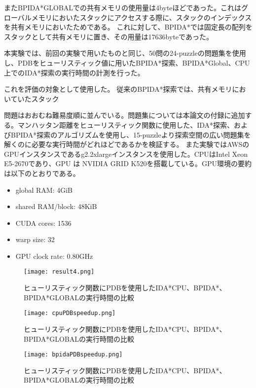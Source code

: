 \documentclass[a4paper,11pt,oneside,openany]{jsbook}
\begin{document}
またBPIDA*GLOBALでの共有メモリの使用量は4byteほどであった。これはグローバルメモリにおいたスタックにアクセスする際に、スタックのインデックスを共有メモリにおいたためである。
これに対して、BPIDA*では固定長の配列をスタックとして共有メモリに置き、その用量は17636byteであった。



本実験では、前回の実験で用いたものと同じ、50問の24-puzzleの問題集を使用し、PDBをヒューリスティック値に用いたBPIDA*探索、BPIDA*Global、CPU上でのIDA*探索の実行時間の計測を行った。

これを評価の対象として使用した。
従来のBPIDA*探索では、共有メモリにおいていたスタック

問題はおおむね難易度順に並んでいる。問題集については本論文の付録に追加する。マンハッタン距離をヒューリスティック関数に使用した、IDA*探索、およびBPIDA*探索\cite{HA17}のアルゴリズムを使用し、15-puzzleより探索空間の広い問題集を解くのに必要な実行時間がどれほどであるかを検証する。
また実験ではAWSのGPUインスタンスであるg2.2xlargeインスタンスを使用した。CPUはIntel Xeon E5-2670であり、GPU
は NVIDIA GRID K520を搭載している。GPU環境の要約は以下のとおりである。
\begin{itemize}
 \item global RAM: 4GiB
 \item shared RAM/block: 48KiB
 \item CUDA cores: 1536
 \item warp size: 32
 \item GPU clock rate: 0.80GHz
\end{itemize}


\begin{figure}[hbtp]
\begin{center}
\texttt{[image: result4.png]}
\caption{ヒューリスティック関数にPDBを使用したIDA*CPU、BPIDA*、BPIDA*GLOBALの実行時間の比較}
\end{center}
\end{figure}


\begin{figure}[hbtp]
\begin{center}
\texttt{[image: cpuPDBspeedup.png]}
\caption{ヒューリスティック関数にPDBを使用したIDA*CPU、BPIDA*、BPIDA*GLOBALの実行時間の比較}
\end{center}
\end{figure}


\begin{figure}[hbtp]
\begin{center}
\texttt{[image: bpidaPDBspeedup.png]}
\caption{ヒューリスティック関数にPDBを使用したIDA*CPU、BPIDA*、BPIDA*GLOBALの実行時間の比較}
\end{center}
\end{figure}
\end{document}
